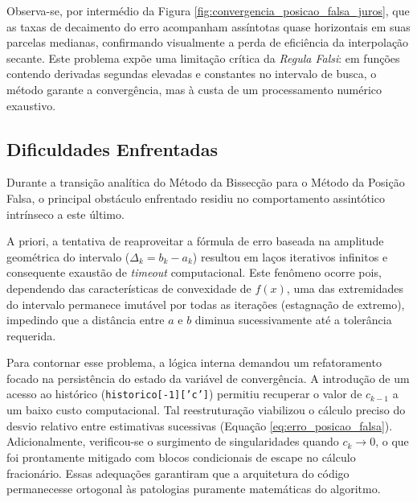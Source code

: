 Observa-se, por intermédio da Figura \ref{fig:convergencia_posicao_falsa_juros}, que as taxas de decaimento do erro acompanham assíntotas quase horizontais em suas parcelas medianas, confirmando visualmente a perda de eficiência da interpolação secante. Este problema expõe uma limitação crítica da \textit{Regula Falsi}: em funções contendo derivadas segundas elevadas e constantes no intervalo de busca, o método garante a convergência, mas à custa de um processamento numérico exaustivo.


\subsection{Dificuldades Enfrentadas}
\label{subsec:dificuldades_posicao_falsa}

Durante a transição analítica do Método da Bissecção para o Método da Posição Falsa, o principal obstáculo enfrentado residiu no comportamento assintótico intrínseco a este último. 

A priori, a tentativa de reaproveitar a fórmula de erro baseada na amplitude geométrica do intervalo ($\Delta_k = b_k - a_k$) resultou em laços iterativos infinitos e consequente exaustão de \textit{timeout} computacional. Este fenômeno ocorre pois, dependendo das características de convexidade de $f(x)$, uma das extremidades do intervalo permanece imutável por todas as iterações (estagnação de extremo), impedindo que a distância entre $a$ e $b$ diminua sucessivamente até a tolerância requerida.

Para contornar esse problema, a lógica interna demandou um refatoramento focado na persistência do estado da variável de convergência. A introdução de um acesso ao histórico (\texttt{historico[-1]['c']}) permitiu recuperar o valor de $c_{k-1}$ a um baixo custo computacional. Tal reestruturação viabilizou o cálculo preciso do desvio relativo entre estimativas sucessivas (Equação \ref{eq:erro_posicao_falsa}). Adicionalmente, verificou-se o surgimento de singularidades quando $c_k \to 0$, o que foi prontamente mitigado com blocos condicionais de escape no cálculo fracionário. Essas adequações garantiram que a arquitetura do código permanecesse ortogonal às patologias puramente matemáticas do algoritmo.